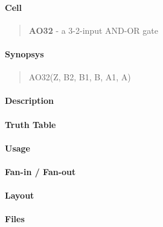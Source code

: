 \label{AO32}
\paragraph{Cell}
\begin{quote}
    \textbf{AO32} - a 3-2-input AND-OR gate
\end{quote}

\paragraph{Synopsys}
\begin{quote}
    AO32(Z, B2, B1, B, A1, A)
\end{quote}

\paragraph{Description}

%

\paragraph{Truth Table}
%

\paragraph{Usage}

\paragraph{Fan-in / Fan-out}

\paragraph{Layout}

\paragraph{Files}
